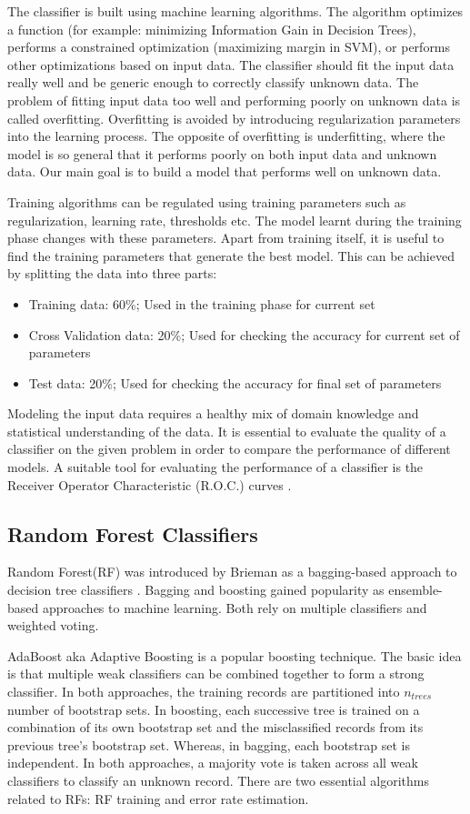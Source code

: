 	The classifier is built using machine learning algorithms. The algorithm optimizes a function (for example: minimizing Information Gain in Decision Trees), performs a constrained optimization (maximizing margin in SVM), or performs other optimizations based on input data. The classifier should fit the input data really well and be generic enough to correctly classify unknown data. The problem of fitting input data too well and performing poorly on unknown data is called overfitting. Overfitting is avoided by introducing regularization parameters into the learning process. The opposite of overfitting is underfitting, where the model is so general that it performs poorly on both input data and unknown data. Our main goal is to build a model that performs well on unknown data. \par
	Training algorithms can be regulated using training parameters such as regularization, learning rate, thresholds etc. The model learnt during the training phase changes with these parameters. Apart from training itself, it is useful to find the training parameters that generate the best model. This can be achieved by splitting the data into three parts:
	\begin{itemize}
	\item Training data: 60\%; Used in the training phase for current set 
	\item Cross Validation data: 20\%; Used for checking the accuracy for current set of parameters
	\item Test data: 20\%; Used for checking the accuracy for final set of parameters
	\end{itemize}
	
	Modeling the input data requires a healthy mix of domain knowledge and statistical understanding of the data. It is essential to evaluate the quality of a classifier on the given problem in order to compare the performance of different models. A suitable tool for evaluating the performance of a classifier is the Receiver Operator Characteristic (R.O.C.) curves \cite{roc}.

	\subsection{Random Forest Classifiers}
	Random Forest(RF) was introduced by Brieman as a bagging-based approach to decision tree classifiers \cite{rf1, rf2}. Bagging and boosting gained popularity as ensemble-based approaches to machine learning. Both rely on multiple classifiers and weighted voting. \par
	AdaBoost aka Adaptive Boosting is a popular boosting technique. The basic idea is that multiple weak classifiers can be combined together to form a strong classifier. In both approaches, the training records are partitioned into $n_{trees}$ number of bootstrap sets. In boosting, each successive tree is trained on a combination of its own bootstrap set and the misclassified records from its previous tree’s bootstrap set. Whereas, in bagging, each bootstrap set is independent. In both approaches, a majority vote is taken across all weak classifiers to classify an unknown record.
	There are two essential algorithms related to RFs: RF training and error rate estimation.
	
